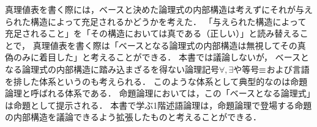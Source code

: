 
\begin{Note}
	真理値表を書く際には，ベースと決めた論理式の内部構造は考えずにそれが与えられた構造によって充足されるかどうかを考えた．
	「与えられた構造によって充足されること」を「その構造においては真である（正しい）」と読み替えることで，
	真理値表を書く際は「ベースとなる論理式の内部構造は無視してその真偽のみに着目した」と考えることができる．
	本書では議論しないが，
	ベースとなる論理式の内部構造に踏み込まざるを得ない論理記号\(\forall, \exists\)や等号\(\equiv\)および言語を排した体系というのも考えられる．
	このような体系として典型的なのは命題論理と呼ばれる体系である．
	命題論理においては，この「ベースとなる論理式」は命題として提示される．
	本書で学ぶ1階述語論理は，命題論理で登場する命題の内部構造を議論できるよう拡張したものと考えることができる．
\end{Note}

